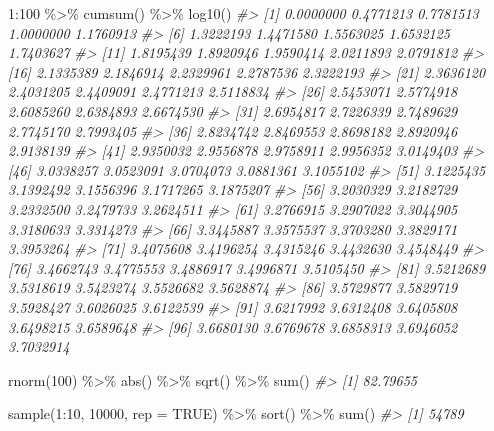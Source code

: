 \documentclass[
]{book}
\newenvironment{Shaded}{\begin{snugshade}}{\end{snugshade}}
\newcommand{\AttributeTok}[1]{\textcolor[rgb]{0.77,0.63,0.00}{#1}}
\newcommand{\CommentTok}[1]{\textcolor[rgb]{0.56,0.35,0.01}{\textit{#1}}}
\newcommand{\ConstantTok}[1]{\textcolor[rgb]{0.00,0.00,0.00}{#1}}
\newcommand{\DecValTok}[1]{\textcolor[rgb]{0.00,0.00,0.81}{#1}}
\newcommand{\FunctionTok}[1]{\textcolor[rgb]{0.00,0.00,0.00}{#1}}
\newcommand{\NormalTok}[1]{#1}
\newcommand{\SpecialCharTok}[1]{\textcolor[rgb]{0.00,0.00,0.00}{#1}}
\begin{document}
\begin{Shaded}
\begin{Highlighting}[]
\DecValTok{1}\SpecialCharTok{:}\DecValTok{100} \SpecialCharTok{\%\textgreater{}\%} 
    \FunctionTok{cumsum}\NormalTok{() }\SpecialCharTok{\%\textgreater{}\%} 
    \FunctionTok{log10}\NormalTok{()}
\CommentTok{\#\textgreater{}   [1] 0.0000000 0.4771213 0.7781513 1.0000000 1.1760913}
\CommentTok{\#\textgreater{}   [6] 1.3222193 1.4471580 1.5563025 1.6532125 1.7403627}
\CommentTok{\#\textgreater{}  [11] 1.8195439 1.8920946 1.9590414 2.0211893 2.0791812}
\CommentTok{\#\textgreater{}  [16] 2.1335389 2.1846914 2.2329961 2.2787536 2.3222193}
\CommentTok{\#\textgreater{}  [21] 2.3636120 2.4031205 2.4409091 2.4771213 2.5118834}
\CommentTok{\#\textgreater{}  [26] 2.5453071 2.5774918 2.6085260 2.6384893 2.6674530}
\CommentTok{\#\textgreater{}  [31] 2.6954817 2.7226339 2.7489629 2.7745170 2.7993405}
\CommentTok{\#\textgreater{}  [36] 2.8234742 2.8469553 2.8698182 2.8920946 2.9138139}
\CommentTok{\#\textgreater{}  [41] 2.9350032 2.9556878 2.9758911 2.9956352 3.0149403}
\CommentTok{\#\textgreater{}  [46] 3.0338257 3.0523091 3.0704073 3.0881361 3.1055102}
\CommentTok{\#\textgreater{}  [51] 3.1225435 3.1392492 3.1556396 3.1717265 3.1875207}
\CommentTok{\#\textgreater{}  [56] 3.2030329 3.2182729 3.2332500 3.2479733 3.2624511}
\CommentTok{\#\textgreater{}  [61] 3.2766915 3.2907022 3.3044905 3.3180633 3.3314273}
\CommentTok{\#\textgreater{}  [66] 3.3445887 3.3575537 3.3703280 3.3829171 3.3953264}
\CommentTok{\#\textgreater{}  [71] 3.4075608 3.4196254 3.4315246 3.4432630 3.4548449}
\CommentTok{\#\textgreater{}  [76] 3.4662743 3.4775553 3.4886917 3.4996871 3.5105450}
\CommentTok{\#\textgreater{}  [81] 3.5212689 3.5318619 3.5423274 3.5526682 3.5628874}
\CommentTok{\#\textgreater{}  [86] 3.5729877 3.5829719 3.5928427 3.6026025 3.6122539}
\CommentTok{\#\textgreater{}  [91] 3.6217992 3.6312408 3.6405808 3.6498215 3.6589648}
\CommentTok{\#\textgreater{}  [96] 3.6680130 3.6769678 3.6858313 3.6946052 3.7032914}

\FunctionTok{rnorm}\NormalTok{(}\DecValTok{100}\NormalTok{) }\SpecialCharTok{\%\textgreater{}\%} 
    \FunctionTok{abs}\NormalTok{() }\SpecialCharTok{\%\textgreater{}\%} 
    \FunctionTok{sqrt}\NormalTok{() }\SpecialCharTok{\%\textgreater{}\%} 
    \FunctionTok{sum}\NormalTok{()}
\CommentTok{\#\textgreater{} [1] 82.79655}

\FunctionTok{sample}\NormalTok{(}\DecValTok{1}\SpecialCharTok{:}\DecValTok{10}\NormalTok{, }\DecValTok{10000}\NormalTok{, }\AttributeTok{rep =} \ConstantTok{TRUE}\NormalTok{) }\SpecialCharTok{\%\textgreater{}\%} 
    \FunctionTok{sort}\NormalTok{() }\SpecialCharTok{\%\textgreater{}\%} 
    \FunctionTok{sum}\NormalTok{()}
\CommentTok{\#\textgreater{} [1] 54789}
\end{Highlighting}
\end{Shaded}
\end{document}
